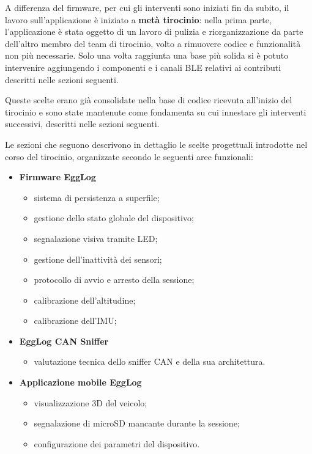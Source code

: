 A differenza del firmware, per cui gli interventi sono iniziati fin da subito, il lavoro sull'applicazione è iniziato a \textbf{metà tirocinio}:
nella prima parte, l'applicazione è stata oggetto di un lavoro di pulizia e riorganizzazione da parte dell'altro membro del team di tirocinio,
volto a rimuovere codice e funzionalità non più necessarie. Solo una volta raggiunta una base più solida si è potuto intervenire aggiungendo
i componenti e i canali BLE relativi ai contributi descritti nelle sezioni seguenti.

Queste scelte erano già consolidate nella base di codice ricevuta all'inizio del tirocinio e sono state mantenute come fondamenta su cui innestare gli
interventi successivi, descritti nelle sezioni seguenti.

\newpage



Le sezioni che seguono descrivono in dettaglio le scelte progettuali introdotte nel corso del tirocinio, organizzate secondo le seguenti aree funzionali:
\begin{itemize}
    \item \textbf{Firmware EggLog}
    \begin{itemize}
        \item sistema di persistenza a superfile;
        \item gestione dello stato globale del dispositivo;
        \item segnalazione visiva tramite LED;
        \item gestione dell'inattività dei sensori;
        \item protocollo di avvio e arresto della sessione;
        \item calibrazione dell'altitudine;
        \item calibrazione dell'IMU;
    \end{itemize}

    \item \textbf{EggLog CAN Sniffer}
    \begin{itemize}
        \item valutazione tecnica dello sniffer CAN e della sua architettura.
    \end{itemize}

    \item \textbf{Applicazione mobile EggLog}
    \begin{itemize}
        \item visualizzazione 3D del veicolo;
        \item segnalazione di microSD mancante durante la sessione;
        \item configurazione dei parametri del dispositivo.
    \end{itemize}
\end{itemize}

